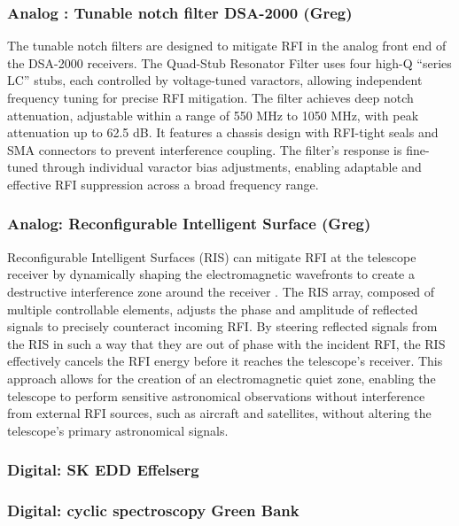 \subsubsection{Analog : Tunable notch filter DSA-2000 (Greg)}

The tunable notch filters are designed to mitigate RFI in the analog front end of the DSA-2000 receivers. The Quad-Stub Resonator Filter uses four high-Q “series LC” stubs, each controlled by voltage-tuned varactors, allowing independent frequency tuning for precise RFI mitigation. The filter achieves deep notch attenuation, adjustable within a range of 550 MHz to 1050 MHz, with peak attenuation up to 62.5 dB. It features a chassis design with RFI-tight seals and SMA connectors to prevent interference coupling. The filter's response is fine-tuned through individual varactor bias adjustments, enabling adaptable and effective RFI suppression across a broad frequency range.

\subsubsection{Analog: Reconfigurable Intelligent Surface (Greg)}

Reconfigurable Intelligent Surfaces (RIS) can mitigate RFI at the telescope receiver by dynamically shaping the electromagnetic wavefronts to create a destructive interference zone around the receiver \cite{zou2022scisrs,wei2024ris,wei2023multistage}. The RIS array, composed of multiple controllable elements, adjusts the phase and amplitude of reflected signals to precisely counteract incoming RFI. By steering reflected signals from the RIS in such a way that they are out of phase with the incident RFI, the RIS effectively cancels the RFI energy before it reaches the telescope’s receiver. This approach allows for the creation of an electromagnetic quiet zone, enabling the telescope to perform sensitive astronomical observations without interference from external RFI sources, such as aircraft and satellites, without altering the telescope’s primary astronomical signals.

\subsubsection{Digital: SK EDD Effelserg}
\subsubsection{Digital: cyclic spectroscopy Green Bank}

